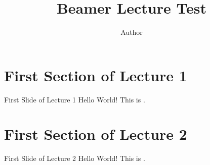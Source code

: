 \documentclass[
	aspectratio=169, %
	8pt, %
]{beamer}
\title{Beamer Lecture Test}
\author{Author}
\begin{document}
    \maketitle

    \contentoverview


    \section{First Section of Lecture 1}

    \begin{frame}{First Slide of Lecture 1}
        Hello World! This is \insertlecture.
    \end{frame}


    \section{First Section of Lecture 2}

    \begin{frame}{First Slide of Lecture 2}
        Hello World! This is \insertlecture.
    \end{frame}
\end{document}
